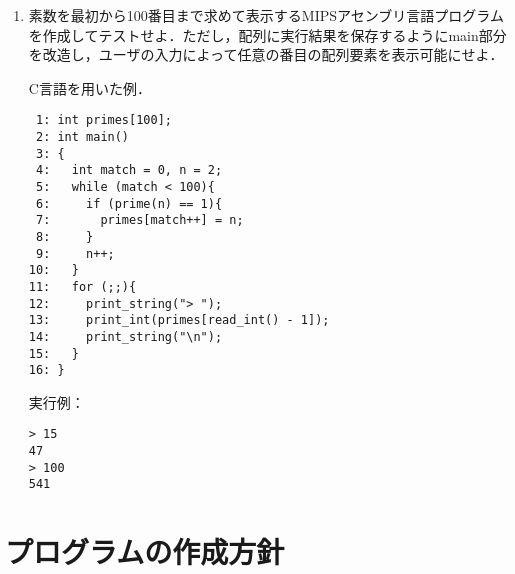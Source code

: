 \documentclass[a4j]{jarticle}
\begin{document}
\begin{enumerate}
C言語を用いた例．

{\baselineskip 3mm
\begin{verbatim}
 1: int prime(int n)
 2: {
 3:   int i;
 4:   for (i = 2; i < n; i++){
 5:     if (n % i == 0)
 6:       return 0;
 7:   }
 8:   return 1;
 9: }
10: 
11: int main()
12: {
13:   int match = 0, n = 2;
14:   while (match < 100){
15:     if (prime(n) == 1){
16:       print_int(n);
17:       print_string(" ");
18:       match++;
19:     }
20:     n++;
21:   }
22:   print_string("\n");
23: }
\end{verbatim}
}

実行例：

{\baselineskip 3mm
\begin{verbatim}
  2   3   5   7  11  13  17  19  23  29
 31  37  41  43  47  53  59  61  67  71
 73  79  83  89  97 101 103 107 109 113
127 131 137 139 149 151 157 163 167 173
179 181 191 193 197 199 211 223 227 229
233 239 241 251 257 263 269 271 277 281
283 293 307 311 313 317 331 337 347 349
353 359 367 373 379 383 389 397 401 409
419 421 431 433 439 443 449 457 461 463
467 479 487 491 499 503 509 521 523 541
\end{verbatim}
}


\item 素数を最初から100番目まで求めて表示するMIPSアセンブリ言語プログラムを作成してテストせよ．ただし，配列に実行結果を保存するようにmain部分を改造し，ユーザの入力によって任意の番目の配列要素を表示可能にせよ．

C言語を用いた例．

{\baselineskip 3mm
\begin{verbatim}
 1: int primes[100];
 2: int main()
 3: {
 4:   int match = 0, n = 2;
 5:   while (match < 100){
 6:     if (prime(n) == 1){
 7:       primes[match++] = n;
 8:     }
 9:     n++;
10:   }
11:   for (;;){
12:     print_string("> ");
13:     print_int(primes[read_int() - 1]);
14:     print_string("\n");
15:   }
16: }
\end{verbatim}
}


実行例：

{\baselineskip 3mm
\begin{verbatim}
> 15
47
> 100
541
\end{verbatim}
}


\end{enumerate}


%
%

\section{プログラムの作成方針}
\end{document}
